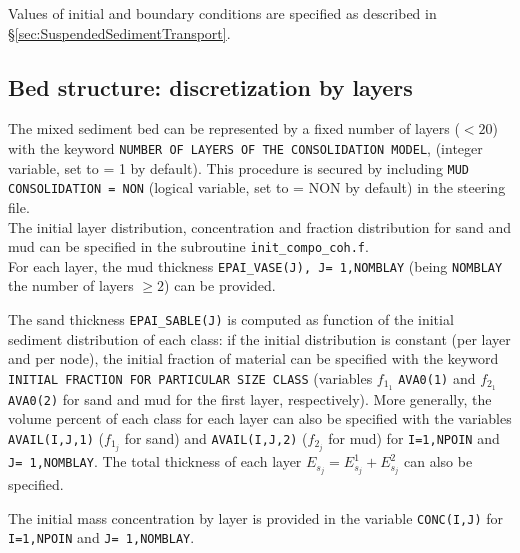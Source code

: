 Values of initial and boundary conditions are specified as described in \S\ref{sec:SuspendedSedimentTransport}.

\subsection{Bed structure: discretization by layers}
The mixed sediment bed can be represented by a fixed number of layers ($<20$) with the keyword \texttt{NUMBER OF LAYERS OF THE CONSOLIDATION MODEL}, (integer variable, set to {\ttfamily = 1} by default). This procedure is secured by including \texttt{MUD CONSOLIDATION = NON} (logical variable, set to {\ttfamily = NON} by default) in the steering file.\\

The initial layer distribution, concentration and fraction distribution for sand and mud can be specified in the subroutine \texttt{init\_compo\_coh.f}.\\

For each layer, the mud thickness \texttt{EPAI\_VASE(J), J= 1,NOMBLAY} (being \texttt{NOMBLAY} the number of layers $\geq 2$) can be provided.

The sand thickness \texttt{EPAI\_SABLE(J)} is computed as function of the initial sediment distribution of each class: if the initial distribution is constant (per layer and per node), the initial fraction of material can be specified with the keyword \texttt{INITIAL FRACTION FOR PARTICULAR SIZE CLASS} (variables $f_{1_1}$ \texttt{AVA0(1)} and $f_{2_1}$ \texttt{AVA0(2)} for sand and mud for the first layer, respectively).
More generally, the volume percent of each class for each layer can also be specified with the variables \texttt{AVAIL(I,J,1)} ($f_{1_j}$ for sand) and \texttt{AVAIL(I,J,2)} ($f_{2_j}$ for mud) for \texttt{I=1,NPOIN} and \texttt{J= 1,NOMBLAY}. The total thickness of each layer $E_{s_j} = E_{s_j}^1 + E_{s_j}^2$ can also be specified. 

The initial mass concentration by layer is provided in the variable \texttt{CONC(I,J)} for \texttt{I=1,NPOIN} and \texttt{J= 1,NOMBLAY}.


